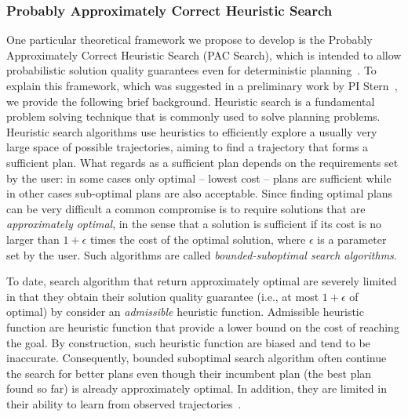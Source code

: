 \documentclass[12pt]{article}
\begin{document}
\subsubsection{Probably Approximately Correct Heuristic Search} 
One particular theoretical framework we propose to develop is the Probably Approximately Correct Heuristic Search (PAC Search), which is intended to allow probabilistic solution quality guarantees even for deterministic planning~\cite{stern2011probably,stern2012search}. 
To explain this framework, which was suggested in a preliminary work by PI Stern~\cite{stern2011probably,stern2012search}, we provide the following brief background. 
Heuristic search is a fundamental problem solving technique that is commonly used to solve planning problems. Heuristic search algorithms use heuristics to efficiently explore a usually very large space of possible trajectories, aiming to find a trajectory that forms a sufficient plan. What regards as a sufficient plan depends on the requirements set by the user: in some cases only optimal -- lowest cost -- plans are sufficient while in other cases sub-optimal plans are also acceptable. Since finding optimal plans can be very difficult a common compromise is to require solutions that are {\em approximately optimal}, in the sense that a solution is sufficient if its cost is no larger than $1+\epsilon$ times the cost of the optimal solution, where $\epsilon$ is a parameter set by the user. Such algorithms are called {\em bounded-suboptimal search algorithms}. 


To date, search algorithm that return approximately optimal are severely limited in that they obtain their solution quality guarantee (i.e., at most $1+\epsilon$ of optimal) by consider an {\em admissible} heuristic function. Admissible heuristic function are heuristic function that provide a lower bound on the cost of reaching the goal. By construction, such heuristic function are biased and tend to be inaccurate. Consequently, bounded suboptimal search algorithm often continue the search for better plans even though their incumbent plan (the best plan found so far) is already approximately optimal. In addition, they are limited in their ability to learn from observed trajectories~\cite{ees,egraphs}.
\end{document}
